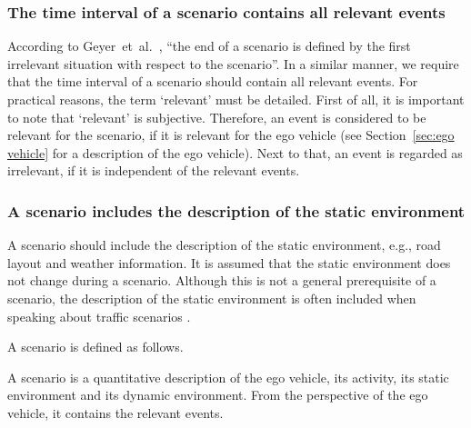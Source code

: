 \subsubsection{The time interval of a scenario contains all relevant events}
According to Geyer~et~al.~\cite{geyer2014}, ``the end of a scenario is defined by the first irrelevant situation with respect to the scenario''. In a similar manner, we require that the time interval of a scenario should contain all relevant events. For practical reasons, the term `relevant' must be detailed. First of all, it is important to note that `relevant' is subjective. Therefore, an event is considered to be relevant for the scenario, if it is relevant for the ego vehicle (see Section~\ref{sec:ego vehicle} for a description of the ego vehicle). Next to that, an event is regarded as irrelevant, if it is independent of the relevant events.
	
\subsubsection{A scenario includes the description of the static environment}
A scenario should include the description of the static environment, e.g., road layout and weather information. It is assumed that the static environment does not change during a scenario. Although this is not a general prerequisite of a scenario, the description of the static environment is often included when speaking about traffic scenarios \cite{geyer2014, ulbrich2015, elrofai2016scenario, ebner2011identifying, schuldt2013effiziente, althoff2017CommonRoad, bagschik2017ontology}.

A scenario is defined as follows.
\begin{definition}[Scenario]
	A scenario is a quantitative description of the ego vehicle, its activity, its static environment and its dynamic environment. From the perspective of the ego vehicle, it contains the relevant events.
\end{definition}
